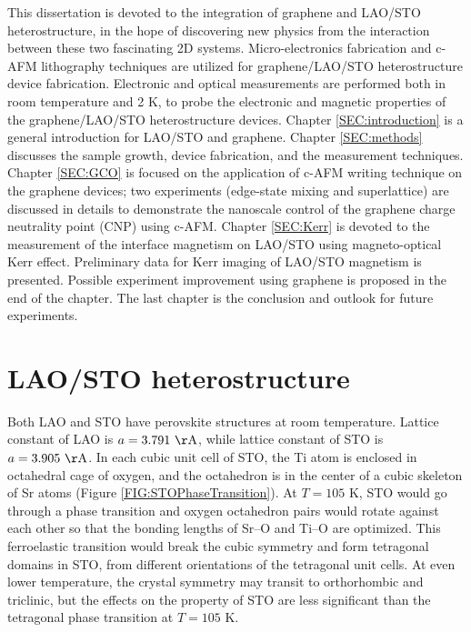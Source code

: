 \documentclass[pdflatex, sectionletters, 12pt]{pittetd}    %
\begin{document}
This dissertation is devoted to the integration of graphene and LAO/STO heterostructure, in the hope of discovering new physics from the interaction between these two fascinating 2D systems. Micro-electronics fabrication and c-AFM lithography techniques are utilized for graphene/LAO/STO heterostructure device fabrication. Electronic and optical measurements are performed both in room temperature and 2 K, to probe the electronic and magnetic properties of the graphene/LAO/STO heterostructure devices. Chapter \ref{SEC:introduction} is a general introduction for LAO/STO and graphene. Chapter \ref{SEC:methods} discusses the sample growth, device fabrication, and the measurement techniques. Chapter \ref{SEC:GCO} is focused on the application of c-AFM writing technique on the graphene devices; two experiments (edge-state mixing and superlattice) are discussed in details to demonstrate the nanoscale control of the graphene charge neutrality point (CNP) using c-AFM. Chapter \ref{SEC:Kerr} is devoted to the measurement of the interface magnetism on LAO/STO using magneto-optical Kerr effect. Preliminary data for Kerr imaging of LAO/STO magnetism is presented. Possible experiment improvement using graphene is proposed in the end of the chapter. The last chapter is the conclusion and outlook for future experiments.

\section{LAO/STO heterostructure}

Both LAO and STO have perovskite structures at room temperature. Lattice constant of LAO is $a = 3.791 \ \mathrm{\AA}$\cite{geller1956crystallographic}, while lattice constant of STO is $a = 3.905 \ \mathrm{\AA}$. In each cubic unit cell of STO, the Ti atom is enclosed in octahedral cage of oxygen, and the octahedron is in the center of a cubic skeleton of Sr atoms (Figure \ref{FIG:STOPhaseTransition}). At $T=105$ K, STO would go through a phase transition and oxygen octahedron pairs would rotate against each other so that the bonding lengths of Sr--O and Ti--O are optimized\cite{sulpizio2014nanoscale}. This ferroelastic transition would break the cubic symmetry and form tetragonal domains in STO, from different orientations of the tetragonal unit cells. At even lower temperature, the crystal symmetry may transit to orthorhombic and triclinic, but the effects on the property of STO are less significant than the tetragonal phase transition at $T=105$ K.
\\
\end{document}
